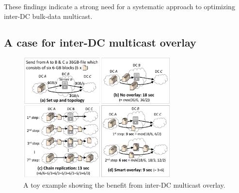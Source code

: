 \vspace{0.1cm}
These findings indicate a strong need for a systematic approach
to optimizing inter-DC bulk-data multicast.


%
%
%
%

\subsection{A case for inter-DC multicast overlay}
\label{subsec:motivation:case-for}


\begin{figure}[t]
\centering
\includegraphics[width=80mm]{images/example-junchen.pdf}
\caption{A toy example showing the benefit from inter-DC multicast overlay.}
\label{fig:case:example}
\vspace{-0.4cm}
\end{figure}

